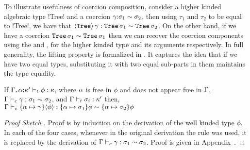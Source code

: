 \documentclass[screen,nonacm,manuscript,review]{acmart} %
\begin{document}
To illustrate usefulness of coercion composition, consider a higher
kinded algebraic type !Tree! and a coercion
$\gamma{:}\sigma_1\sim\sigma_2$, then using $\tau_1$ and $\tau_2$ to be
equal to !Tree!, we have that $\langle{\texttt{Tree}}\rangle \,\gamma :
\texttt{Tree}\,\sigma_1 \sim \texttt{Tree}\,\sigma_2$. On the
other hand, if we have a coercion $\texttt{Tree}\,\sigma_1 \sim
\texttt{Tree}\,\sigma_1$ then we can recover the coercion components
using the  and , for the higher kinded
type and its arguments respectively. In full generality, the lifting
property is formalized in  .
It captures the idea that if we have two equal types,
substituting it with two equal sub-parts
in them maintains the type equality.

\begin{theorem}\label{thm:sfc-coercion-lifting}
 If $\Gamma,\alpha{:}\kappa' \vdash_{t} \phi : \kappa$, where $\alpha$ is free in $\phi$
 and does not appear free in $\Gamma$,
 $\Gamma \vdash_{c} \gamma : \sigma_1\sim\sigma_2$, and $\Gamma \vdash_{t} \sigma_i : \kappa'$
 then, $\Gamma \vdash_{c} \{\alpha\mapsto \gamma\}\langle{\phi}\rangle : \{\alpha\mapsto\sigma_1\}\phi\sim\{\alpha\mapsto\sigma_2\}\phi$
\end{theorem}
\begin{proof}[Proof Sketch ]
 Proof is by induction on the derivation of the well kinded type
 $\phi$. In each of the four cases, whenever in the original
 derivation the rule  was used, it is replaced by the
 derivation of $\Gamma \vdash_{c} \gamma : \sigma_1\sim\sigma_2$. Proof is
 given in Appendix~.
\end{proof}

\newcommand\TVar{
 \ib{\irule[\trule{var}]
 {x\co\tau \in \TEnv};
 {\Typing \TEnv x \tau}
 }
}

\newcommand\TAbs{
 \ib{\irule[\trule{\I\to}]
 {\Typing {\TEnv,x\co\sigma} {M} {\tau}};
 {\Typing \TEnv {\Lam x M} {\sigma \to \tau}}
 }
}
\newcommand\TApp{
 \ib{\irule[\trule{\E\to}]
 {\Typing \TEnv \Tm {\sigma \to \tau}}
 {\Typing \TEnv N \sigma};
 {\Typing \TEnv {\Tm \App N} {\tau}}
 }
}
\newcommand\TTyApp{
 \ib{\irule[\trule{\E\forall}]
 {\Typing  \TEnv \Tm {\Forall {\alpha\co\kappa} \tau}}
 {\Kinding \TEnv \sigma \kappa};
 {\Typing  \TEnv {M\App\sigma} {\tau}}
 }
}

\newcommand\TTyAbs{
 \ib{\irule[\trule{\I\forall}]
   {\Typing {\TEnv,\alpha\co\kappa} \Tm \tau}
   {\alpha\#\TEnv};
   {\Typing \TEnv {\Forall {\alpha\co\kappa} \Tm} {\tau}}
 }
}
\end{document}
